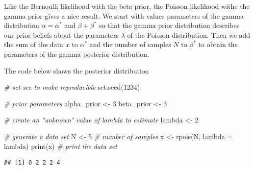 \documentclass[
]{book}
\newenvironment{Shaded}{\begin{snugshade}}{\end{snugshade}}
\newcommand{\AttributeTok}[1]{\textcolor[rgb]{0.77,0.63,0.00}{#1}}
\newcommand{\CommentTok}[1]{\textcolor[rgb]{0.56,0.35,0.01}{\textit{#1}}}
\newcommand{\DecValTok}[1]{\textcolor[rgb]{0.00,0.00,0.81}{#1}}
\newcommand{\FunctionTok}[1]{\textcolor[rgb]{0.00,0.00,0.00}{#1}}
\newcommand{\NormalTok}[1]{#1}
\newcommand{\OtherTok}[1]{\textcolor[rgb]{0.56,0.35,0.01}{#1}}
\begin{document}
Like the Bernoulli likelihood with the beta prior, the Poisson likelihood withe the gamma prior gives a nice result. We start with values parameters of the gamma distribution \(\alpha = \alpha^*\) and \(\beta + \beta^*\) so that the gamma prior distribution describes our prior beliefs about the parameters \(\lambda\) of the Poisson distribution. Then we add the sum of the data \(x\) to \(\alpha^*\) and the number of samples \(N\) to \(\beta^*\) to obtain the parameters of the gamma posterior distribution.

The code below shows the posterior distribution

\begin{Shaded}
\begin{Highlighting}[]
\CommentTok{\# set see to make reproducible}
\FunctionTok{set.seed}\NormalTok{(}\DecValTok{1234}\NormalTok{)}

\CommentTok{\# prior parameters}
\NormalTok{alpha\_prior }\OtherTok{\textless{}{-}} \DecValTok{3}
\NormalTok{beta\_prior }\OtherTok{\textless{}{-}} \DecValTok{3}

\CommentTok{\# create an "unknown" value of lambda to estimate}
\NormalTok{lambda }\OtherTok{\textless{}{-}} \DecValTok{2}

\CommentTok{\# generate a data set}
\NormalTok{N }\OtherTok{\textless{}{-}} \DecValTok{5}  \CommentTok{\# number of samples}
\NormalTok{x }\OtherTok{\textless{}{-}} \FunctionTok{rpois}\NormalTok{(N, }\AttributeTok{lambda =}\NormalTok{ lambda)}
\FunctionTok{print}\NormalTok{(x)  }\CommentTok{\# print the data set}
\end{Highlighting}
\end{Shaded}

\begin{verbatim}
## [1] 0 2 2 2 4
\end{verbatim}
\end{document}

